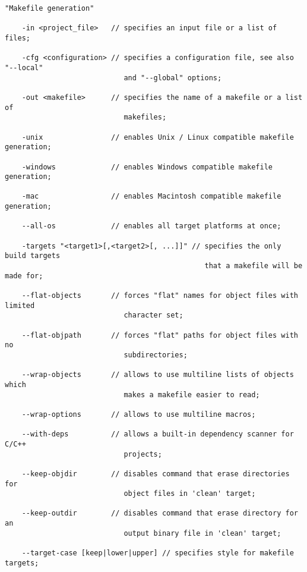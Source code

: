 
\begin{verbatim}
"Makefile generation"

    -in <project_file>   // specifies an input file or a list of files;

    -cfg <configuration> // specifies a configuration file, see also "--local"
                            and "--global" options;

    -out <makefile>      // specifies the name of a makefile or a list of
                            makefiles;

    -unix                // enables Unix / Linux compatible makefile generation;

    -windows             // enables Windows compatible makefile generation;

    -mac                 // enables Macintosh compatible makefile generation;

    --all-os             // enables all target platforms at once;

    -targets "<target1>[,<target2>[, ...]]" // specifies the only build targets
                                               that a makefile will be made for;

    --flat-objects       // forces "flat" names for object files with limited
                            character set;

    --flat-objpath       // forces "flat" paths for object files with no
                            subdirectories;

    --wrap-objects       // allows to use multiline lists of objects which
                            makes a makefile easier to read;

    --wrap-options       // allows to use multiline macros;

    --with-deps          // allows a built-in dependency scanner for C/C++
                            projects;

    --keep-objdir        // disables command that erase directories for
                            object files in 'clean' target;

    --keep-outdir        // disables command that erase directory for an
                            output binary file in 'clean' target;

    --target-case [keep|lower|upper] // specifies style for makefile targets;
\end{verbatim}